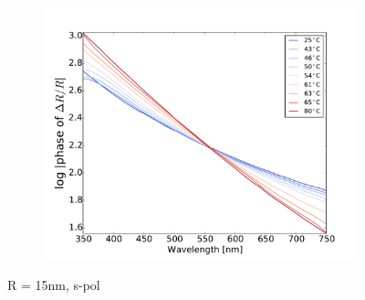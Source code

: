 \begin{figure}
    \begin{subfigure}[b]{0.3\textwidth}
        \centering
        \includegraphics[width=\textwidth]{Results/Sim4/dRphase_visible_log.pdf}
        \caption{}
    \end{subfigure}
    \caption{R = 15nm, s-pol}
\end{figure}
%
